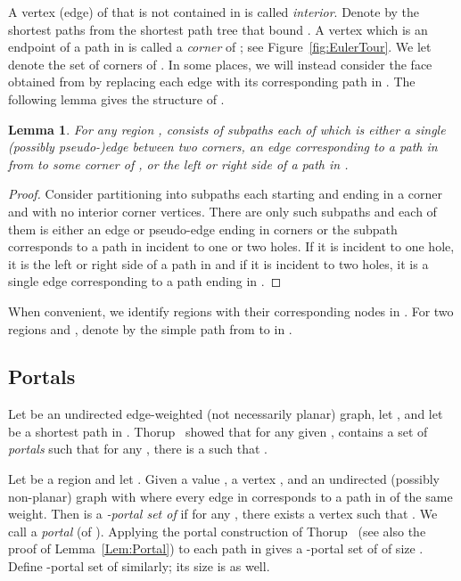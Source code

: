 \documentclass[11pt]{article}
\newtheorem{lemma}{Lemma}
\begin{document}
A vertex (edge) of  that is not contained in  is called \emph{interior}. Denote by  the  shortest paths from the shortest path tree  that bound . A vertex which is an endpoint of a path in  is called a \emph{corner} of ; see Figure~\ref{fig:EulerTour}. We let  denote the set of  corners of . In some places, we will instead consider the face  obtained from  by replacing each edge with its corresponding path in . The following lemma gives the structure of .
\begin{lemma}\label{Lem:deltaR}
For any region ,  consists of  subpaths each of which is either a single (possibly pseudo-)edge between two corners, an edge corresponding to a path in  from  to some corner of , or the left or right side of a path in .
\end{lemma}
\begin{proof}
Consider partitioning  into subpaths each starting and ending in a corner and with no interior corner vertices. There are only  such subpaths and each of them is either an edge or pseudo-edge ending in corners or the subpath corresponds to a path in  incident to one or two holes. If it is incident to one hole, it is the left or right side of a path in  and if it is incident to two holes, it is a single edge corresponding to a path ending in .
\end{proof}

When convenient, we identify regions with their corresponding nodes in . For two regions  and , denote by  the simple path from  to  in .

\subsection{Portals}
Let  be an undirected edge-weighted (not necessarily planar) graph, let , and let  be a shortest path in . Thorup~\cite{OraclePlanarThorup} showed that for any given ,  contains a set  of  \emph{portals} such that for any , there is a  such that .

Let  be a region and let . Given a value , a vertex , and an undirected (possibly non-planar) graph  with  where every edge  in  corresponds to a path  in  of the same weight. Then  is a \emph{-portal set of } if for any , there exists a vertex  such that . We call  a \emph{portal} (of ). Applying the portal construction of Thorup~\cite{OraclePlanarThorup} (see also the proof of Lemma~\ref{Lem:Portal}) to each path in  gives a -portal set of  of size . Define -portal set of  similarly; its size is  as well.
\end{document}

